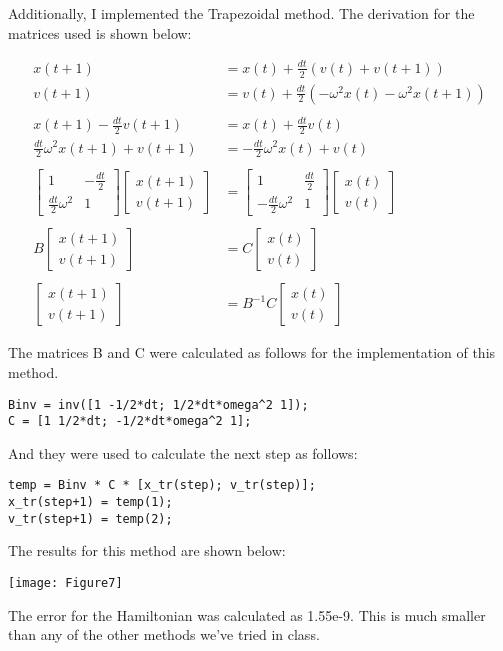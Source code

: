 \documentclass{article}
\begin{document}
Additionally, I implemented the Trapezoidal method. The derivation for the matrices used is shown below:

\begin{align*}
x(t+1) &= x(t) +\frac{dt}{2}( v(t) + v(t+1))\\
v(t+1) &= v(t) +\frac{dt}{2} (  -\omega^2 x(t) -\omega^2 x(t+1))\\
\\
x(t+1) - \frac{dt}{2} v(t+1)&= x(t) +\frac{dt}{2} v(t)\\
\frac{dt}{2} \omega^2 x(t+1) +  v(t+1) &= -\frac{dt}{2}\omega^2 x(t) +v(t) \\
\\
\begin{bmatrix}
1 & -\frac{dt}{2} \\ \frac{dt}{2}\omega^2& 1
\end{bmatrix}
\begin{bmatrix}
x(t+1) \\ v(t+1)
\end{bmatrix}
&= \begin{bmatrix}
1 & \frac{dt}{2} \\ -\frac{dt}{2}\omega^2  & 1
\end{bmatrix}
\begin{bmatrix}
x(t) \\ v(t)
\end{bmatrix}\\
\\
B
\begin{bmatrix}
x(t+1) \\ v(t+1)
\end{bmatrix}
&= C
\begin{bmatrix}
x(t) \\ v(t)
\end{bmatrix}\\
\\
\begin{bmatrix}
x(t+1) \\ v(t+1)
\end{bmatrix}
&= B^{-1}C
\begin{bmatrix}
x(t) \\ v(t)
\end{bmatrix}
\end{align*}

The matrices B and C were calculated as follows for the implementation of this method.

\begin{verbatim}
Binv = inv([1 -1/2*dt; 1/2*dt*omega^2 1]);
C = [1 1/2*dt; -1/2*dt*omega^2 1];
\end{verbatim}

And they were used to calculate the next step as follows:
\begin{verbatim}
temp = Binv * C * [x_tr(step); v_tr(step)];
x_tr(step+1) = temp(1);
v_tr(step+1) = temp(2);
\end{verbatim}

The results for this method are shown below:

\texttt{[image: Figure7]}


The error for the Hamiltonian was calculated as 1.55e-9. This is much smaller than any of the other methods we've tried in class. 
\end{document}
